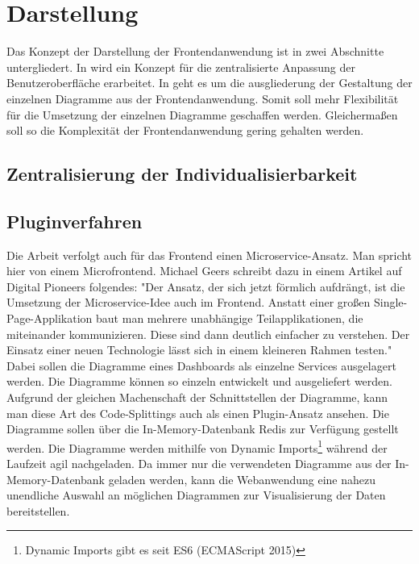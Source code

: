 \section{Darstellung}
\label{sec:darstellung}
Das Konzept der Darstellung der Frontendanwendung ist in zwei Abschnitte untergliedert.
In  wird ein Konzept für die
zentralisierte Anpassung der Benutzeroberfläche erarbeitet. In 
geht es um die ausgliederung der Gestaltung der einzelnen Diagramme aus der Frontendanwendung.
Somit soll mehr Flexibilität für die Umsetzung der einzelnen Diagramme geschaffen werden.
Gleichermaßen soll so die Komplexität der Frontendanwendung gering gehalten werden.

\subsection{Zentralisierung der Individualisierbarkeit}
\label{subsec:zentralisierungderindividualisierbarkeit}

\subsection{Pluginverfahren}
\label{subsec:pluginverfahren}

Die Arbeit verfolgt auch für das Frontend einen Microservice-Ansatz. Man spricht hier von einem
Microfrontend. Michael Geers schreibt dazu in einem Artikel auf Digital Pioneers folgendes:
"Der Ansatz, der sich jetzt förmlich aufdrängt, ist die Umsetzung der Microservice-Idee
auch im Frontend. Anstatt einer ­großen Single-Page-Applikation baut man mehrere unabhängige
Teilapplikationen, die miteinander kommunizieren. Diese sind dann deutlich einfacher zu verstehen.
Der Einsatz einer neuen Technologie lässt sich in einem kleineren Rahmen testen."\cite{MicrofrontendT3N}
Dabei sollen die Diagramme eines Dashboards als einzelne Services ausgelagert werden.
Die Diagramme können so einzeln entwickelt und ausgeliefert werden. Aufgrund der
gleichen Machenschaft der Schnittstellen der Diagramme, kann man diese Art des Code-Splittings auch als
einen Plugin-Ansatz ansehen. Die Diagramme sollen über die In-Memory-Datenbank
Redis zur Verfügung gestellt werden. Die Diagramme werden mithilfe
von Dynamic Imports\footnote{Dynamic Imports gibt es seit ES6 (ECMAScript 2015)\cite{DynamicImportsV8}}
während der Laufzeit agil nachgeladen. Da immer nur die verwendeten Diagramme aus der In-Memory-Datenbank
geladen werden, kann die Webanwendung eine nahezu unendliche Auswahl an möglichen Diagrammen zur Visualisierung
der Daten bereitstellen.

